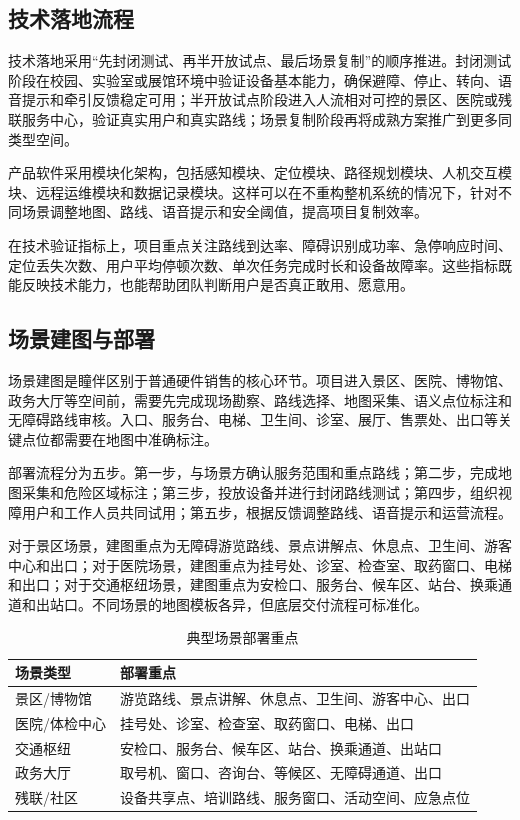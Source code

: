 \documentclass[a4paper,fontset=none]{ctexart}
\begin{document}
\subsection{技术落地流程}

技术落地采用“先封闭测试、再半开放试点、最后场景复制”的顺序推进。封闭测试阶段在校园、实验室或展馆环境中验证设备基本能力，确保避障、停止、转向、语音提示和牵引反馈稳定可用；半开放试点阶段进入人流相对可控的景区、医院或残联服务中心，验证真实用户和真实路线；场景复制阶段再将成熟方案推广到更多同类型空间。

产品软件采用模块化架构，包括感知模块、定位模块、路径规划模块、人机交互模块、远程运维模块和数据记录模块。这样可以在不重构整机系统的情况下，针对不同场景调整地图、路线、语音提示和安全阈值，提高项目复制效率。

在技术验证指标上，项目重点关注路线到达率、障碍识别成功率、急停响应时间、定位丢失次数、用户平均停顿次数、单次任务完成时长和设备故障率。这些指标既能反映技术能力，也能帮助团队判断用户是否真正敢用、愿意用。

\subsection{场景建图与部署}

场景建图是瞳伴区别于普通硬件销售的核心环节。项目进入景区、医院、博物馆、政务大厅等空间前，需要先完成现场勘察、路线选择、地图采集、语义点位标注和无障碍路线审核。入口、服务台、电梯、卫生间、诊室、展厅、售票处、出口等关键点位都需要在地图中准确标注。

部署流程分为五步。第一步，与场景方确认服务范围和重点路线；第二步，完成地图采集和危险区域标注；第三步，投放设备并进行封闭路线测试；第四步，组织视障用户和工作人员共同试用；第五步，根据反馈调整路线、语音提示和运营流程。

对于景区场景，建图重点为无障碍游览路线、景点讲解点、休息点、卫生间、游客中心和出口；对于医院场景，建图重点为挂号处、诊室、检查室、取药窗口、电梯和出口；对于交通枢纽场景，建图重点为安检口、服务台、候车区、站台、换乘通道和出站口。不同场景的地图模板各异，但底层交付流程可标准化。

\begin{longtable}{@{}>{\raggedright\arraybackslash}p{3cm} >{\raggedright\arraybackslash}p{\dimexpr\textwidth-3cm-2\tabcolsep\relax}@{}}
  \caption{典型场景部署重点}\\
  \toprule
    场景类型 & 部署重点 \\
    \midrule
    景区/博物馆 & 游览路线、景点讲解、休息点、卫生间、游客中心、出口 \\
    医院/体检中心 & 挂号处、诊室、检查室、取药窗口、电梯、出口 \\
    交通枢纽 & 安检口、服务台、候车区、站台、换乘通道、出站口 \\
    政务大厅 & 取号机、窗口、咨询台、等候区、无障碍通道、出口 \\
    残联/社区 & 设备共享点、培训路线、服务窗口、活动空间、应急点位 \\
    \bottomrule
\end{longtable}
\end{document}

